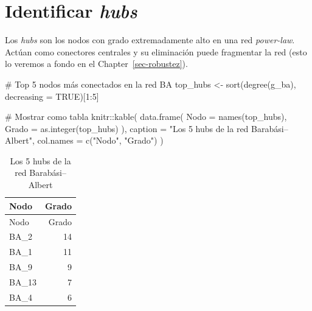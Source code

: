 \documentclass[
  letterpaper,
  DIV=11,
  numbers=noendperiod]{scrreprt}
\newenvironment{Shaded}{\begin{snugshade}}{\end{snugshade}}
\newcommand{\AttributeTok}[1]{\textcolor[rgb]{0.40,0.45,0.13}{#1}}
\newcommand{\CommentTok}[1]{\textcolor[rgb]{0.37,0.37,0.37}{#1}}
\newcommand{\ConstantTok}[1]{\textcolor[rgb]{0.56,0.35,0.01}{#1}}
\newcommand{\DecValTok}[1]{\textcolor[rgb]{0.68,0.00,0.00}{#1}}
\newcommand{\FunctionTok}[1]{\textcolor[rgb]{0.28,0.35,0.67}{#1}}
\newcommand{\NormalTok}[1]{\textcolor[rgb]{0.00,0.23,0.31}{#1}}
\newcommand{\OtherTok}[1]{\textcolor[rgb]{0.00,0.23,0.31}{#1}}
\newcommand{\SpecialCharTok}[1]{\textcolor[rgb]{0.37,0.37,0.37}{#1}}
\newcommand{\StringTok}[1]{\textcolor[rgb]{0.13,0.47,0.30}{#1}}
\begin{document}
\section{\texorpdfstring{Identificar
\emph{hubs}}{Identificar hubs}}\label{identificar-hubs}

Los \emph{hubs} son los nodos con grado extremadamente alto en una red
\emph{power-law}. Actúan como conectores centrales y su eliminación
puede fragmentar la red (esto lo veremos a fondo en el
Chapter~\ref{sec-robustez}).

\begin{Shaded}
\begin{Highlighting}[]
\CommentTok{\# Top 5 nodos más conectados en la red BA}
\NormalTok{top\_hubs }\OtherTok{\textless{}{-}} \FunctionTok{sort}\NormalTok{(}\FunctionTok{degree}\NormalTok{(g\_ba), }\AttributeTok{decreasing =} \ConstantTok{TRUE}\NormalTok{)[}\DecValTok{1}\SpecialCharTok{:}\DecValTok{5}\NormalTok{]}

\CommentTok{\# Mostrar como tabla}
\NormalTok{knitr}\SpecialCharTok{::}\FunctionTok{kable}\NormalTok{(}
  \FunctionTok{data.frame}\NormalTok{(}
    \AttributeTok{Nodo =} \FunctionTok{names}\NormalTok{(top\_hubs),}
    \AttributeTok{Grado =} \FunctionTok{as.integer}\NormalTok{(top\_hubs)}
\NormalTok{  ),}
  \AttributeTok{caption =} \StringTok{"Los 5 hubs de la red Barabási–Albert"}\NormalTok{,}
  \AttributeTok{col.names =} \FunctionTok{c}\NormalTok{(}\StringTok{"Nodo"}\NormalTok{, }\StringTok{"Grado"}\NormalTok{)}
\NormalTok{)}
\end{Highlighting}
\end{Shaded}

\begin{longtable}[]{@{}lr@{}}
\caption{Los 5 hubs de la red Barabási--Albert}\tabularnewline
\toprule\noalign{}
Nodo & Grado \\
\midrule\noalign{}
\endfirsthead
\toprule\noalign{}
Nodo & Grado \\
\midrule\noalign{}
\endhead
\bottomrule\noalign{}
\endlastfoot
BA\_2 & 14 \\
BA\_1 & 11 \\
BA\_9 & 9 \\
BA\_13 & 7 \\
BA\_4 & 6 \\
\end{longtable}
\end{document}
